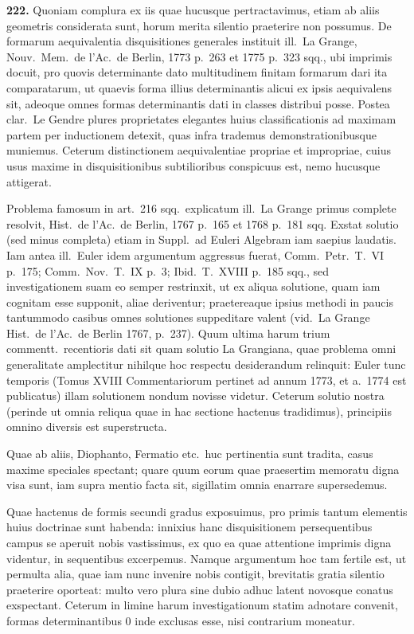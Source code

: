 \documentclass[12pt,a4paper]{article}
\theoremstyle{plain}
\theoremstyle{definition}
\theoremstyle{remark}
\begin{document}
\textbf{222.}
Quoniam complura ex iis quae hucusque pertractavimus, etiam ab aliis geometris considerata sunt, horum merita silentio praeterire non possumus. De formarum aequivalentia disquisitiones generales instituit ill.\ La Grange, Nouv.\ Mem.\ de l'Ac.\ de Berlin, 1773 p.\ 263 et 1775 p.\ 323 sqq., ubi imprimis docuit, pro quovis determinante dato multitudinem finitam formarum dari ita comparatarum, ut quaevis forma illius determinantis alicui ex ipsis aequivalens sit, adeoque omnes formas determinantis dati in classes distribui posse. Postea clar.\ Le Gendre plures proprietates elegantes huius classificationis ad maximam partem per inductionem detexit, quas infra trademus demonstrationibusque muniemus. Ceterum distinctionem aequivalentiae propriae et impropriae, cuius usus maxime in disquisitionibus subtilioribus conspicuus est, nemo hucusque attigerat.

Problema famosum in art.\ 216 sqq.\ explicatum ill.\ La Grange primus complete resolvit, Hist.\ de l'Ac.\ de Berlin, 1767 p.\ 165 et 1768 p.\ 181 sqq. Exstat solutio (sed minus completa) etiam in Suppl.\ ad Euleri Algebram iam saepius laudatis. Iam antea ill.\ Euler idem argumentum aggressus fuerat, Comm.\ Petr.\ T.\ VI p.\ 175; Comm.\ Nov.\ T.\ IX p.\ 3; Ibid.\ T.\ XVIII p.\ 185 sqq., sed investigationem suam eo semper restrinxit, ut ex aliqua solutione, quam iam cognitam esse supponit, aliae deriventur; praetereaque ipsius methodi in paucis tantummodo casibus omnes solutiones suppeditare valent (vid.\ La Grange Hist.\ de l'Ac.\ de Berlin 1767, p.\ 237). Quum ultima harum trium commentt.\ recentioris dati sit quam solutio La Grangiana, quae problema omni generalitate amplectitur nihilque hoc respectu desiderandum relinquit: Euler tunc temporis (Tomus XVIII Commentariorum pertinet ad annum 1773, et a.\ 1774 est publicatus) illam solutionem nondum novisse videtur. Ceterum solutio nostra (perinde ut omnia reliqua quae in hac sectione hactenus tradidimus), principiis omnino diversis est superstructa.

Quae ab aliis, Diophanto, Fermatio etc.\ huc pertinentia sunt tradita, casus maxime speciales spectant; quare quum eorum quae praesertim memoratu digna visa sunt, iam supra mentio facta sit, sigillatim omnia enarrare supersedemus.

Quae hactenus de formis secundi gradus exposuimus, pro primis tantum elementis huius doctrinae sunt habenda: innixius hanc disquisitionem persequentibus campus se aperuit nobis vastissimus, ex quo ea quae attentione imprimis digna videntur, in sequentibus excerpemus. Namque argumentum hoc tam fertile est, ut permulta alia, quae iam nunc invenire nobis contigit, brevitatis gratia silentio praeterire oporteat: multo vero plura sine dubio adhuc latent novosque conatus exspectant. Ceterum in limine harum investigationum statim adnotare convenit, formas determinantibus $0$ inde exclusas esse, nisi contrarium moneatur.
\end{document}
